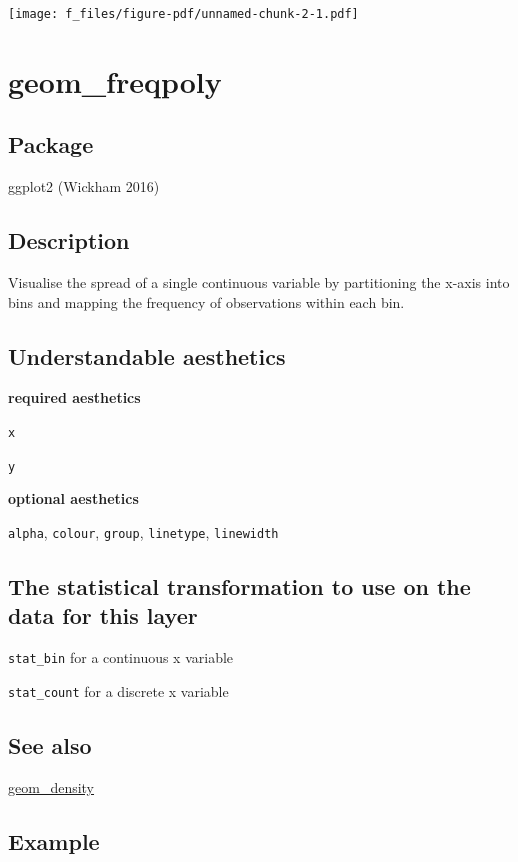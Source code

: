 \documentclass[
  letterpaper,
  DIV=11,
  numbers=noendperiod]{scrreprt}
\begin{document}
\texttt{[image: f\_files/figure-pdf/unnamed-chunk-2-1.pdf]}

\section{geom\_freqpoly}\label{freqpoly}

\subsection{Package}\label{package-5}

ggplot2 (Wickham 2016)

\subsection{Description}\label{description-5}

Visualise the spread of a single continuous variable by partitioning the
x-axis into bins and mapping the frequency of observations within each
bin.

\subsection{Understandable
aesthetics}\label{understandable-aesthetics-6}

\textbf{required aesthetics}

\texttt{x}

\texttt{y}

\textbf{optional aesthetics}

\texttt{alpha}, \texttt{colour}, \texttt{group}, \texttt{linetype},
\texttt{linewidth}

\subsection{The statistical transformation to use on the data for this
layer}\label{the-statistical-transformation-to-use-on-the-data-for-this-layer-5}

\texttt{stat\_bin} for a continuous x variable

\texttt{stat\_count} for a discrete x variable

\subsection{See also}\label{see-also-5}

\hyperref[density]{geom\_density}

\subsection{Example}\label{example-6}
\end{document}
